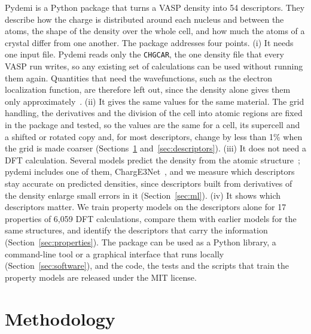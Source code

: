 \documentclass[journal=jctcce,manuscript=article,email=true]{achemso}
\newcommand{\rev}[1]{{\color{blue}#1}}
\begin{document}
Pydemi is a Python package that turns a VASP density into \rev{54} descriptors.
They describe how the charge is distributed around each nucleus and between the
atoms, the shape of the density over the whole cell, and how much the atoms of a
crystal differ from one another. The package addresses four points. (i) It needs
one input file. Pydemi reads only the \texttt{CHGCAR}, the one density file that
every VASP run writes, so any existing set of calculations can be used without
running them again. Quantities that need the wavefunctions, such as the electron
localization function, are therefore left out, since the density alone gives
them only approximately~\cite{abramov1997,tsirelson2002}. (ii) It gives the same
values for the same material. The grid handling, the derivatives and the
division of the cell into atomic regions are fixed in the package and tested, so
the values \rev{are the same for a cell, its supercell and a shifted or rotated copy} and, for most
descriptors, change by less than 1\% when the grid is made coarser
(Sections~\ref{sec:design} and~\ref{sec:descriptors}). (iii) It does not need a
DFT calculation. Several models predict the density from the \rev{atomic}
structure~\cite{chandrasekaran2019,grisafi2019,jorgensen2022,koker2024}; pydemi
includes one of them, ChargE3Net~\cite{koker2024}, and we measure which
descriptors stay accurate on predicted densities, since descriptors built from
derivatives of the density enlarge small errors in it (Section~\ref{sec:ml}).
(iv) It shows which descriptors matter. We train property models on the
descriptors alone for 17 properties of 6,059 DFT calculations, compare them with
earlier models for the same structures, and identify the descriptors that carry
the information (Section~\ref{sec:properties}). The package can be used as a
Python library, a command-line tool or a graphical interface that runs locally
(Section~\ref{sec:software}), and the code, the tests and the scripts that train
the property models are released under the MIT license.

\section{Methodology}
\label{sec:design}
\end{document}
